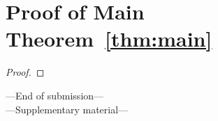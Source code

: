\documentclass[hyperref,envcountsame,envcountsect,runningheads]{llncs}%
\begin{document}











\section{Proof of Main Theorem~\ref{thm:main}}
\label{sec:proof:main}
\begin{proof}

\end{proof}




\newcommand\assertToGlobal\relax
\newcommand\toAssert\relax


\FloatBarrier





{}


\begin{center}
\LARGE
---End of submission---\\
---Supplementary material---
\end{center}
%  

\tableofcontents

\clearpage

\appendix


\FloatBarrier

\FloatBarrier
%
%


%
%


%

\end{document}
